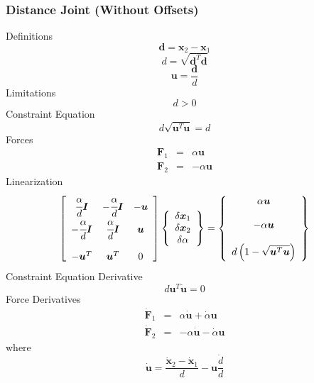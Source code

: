 \documentclass[10pt,dvips,fleqn]{report}
\newcommand{\T}[1]{\boldsymbol{#1}}
\begin{document}
\subsubsection{Distance Joint (Without Offsets)}
Definitions
\begin{equation}
	\T{d} = \T{x}_2 - \T{x}_1
\end{equation}
\begin{equation}
	d = \sqrt{\T{d}^T \T{d}}
\end{equation}
\begin{equation}
	\T{u} = \frac{\T{d}}{d}
\end{equation}
Limitations
\begin{equation}
	d > 0
\end{equation}
Constraint Equation
\begin{equation}
	d \sqrt{\T{u}^T \T{u}} = d
\end{equation}
Forces
\begin{eqnarray}
	\T{F}_1 & = & \alpha \T{u} \\
	\T{F}_2 & = & -\alpha \T{u}
\end{eqnarray}
Linearization
\begin{equation}
	\sqbr{\matr{ccc}{
		\cfrac{\alpha}{d}\T{I} & -\cfrac{\alpha}{d}\T{I} & -\T{u} \\
		-\cfrac{\alpha}{d}\T{I} & \cfrac{\alpha}{d}\T{I} & \T{u} \\
		\\
		-\T{u}^T & \T{u}^T & 0
	}}\cubr{\cvvect{
		\delta\T{x}_1 \\
		\delta\T{x}_2 \\
		\delta\alpha
	}} = \cubr{\cvvect{
		\alpha \T{u} \\
		\\
		- \alpha \T{u} \\
		\\
		d\plbr{1 - \sqrt{\T{u}^T \T{u}}}
	}}
\end{equation}
Constraint Equation Derivative
\begin{equation}
	d \T{u}^T \dot{\T{u}} = 0
\end{equation}
Force Derivatives
\begin{eqnarray}
	\dot{\T{F}}_1 & = & \alpha \dot{\T{u}} + \dot{\alpha} \T{u} \\
	\dot{\T{F}}_2 & = & -\alpha \dot{\T{u}} - \dot{\alpha} \T{u}
\end{eqnarray}
where
\begin{equation}
	\dot{\T{u}} = \frac{\dot{\T{x}}_2 - \dot{\T{x}}_1}{d} - \T{u} \frac{\dot{d}}{d}
\end{equation}
\end{document}
